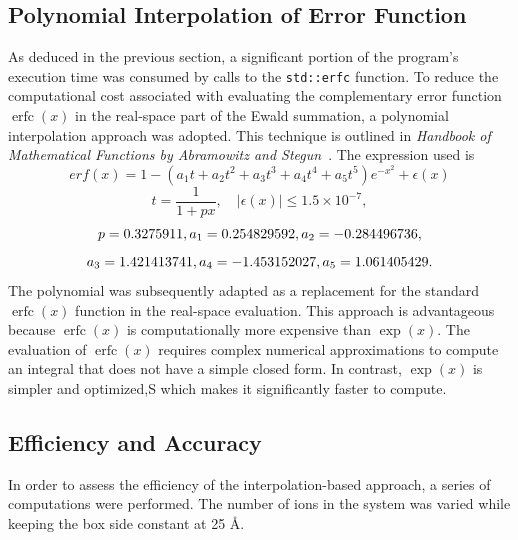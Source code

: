 \subsection{Polynomial Interpolation of Error Function}
As deduced in the previous section, a significant portion of the program’s execution time was consumed by calls to the \verb|std::erfc| function. To reduce the computational cost associated with evaluating the complementary error function \(\operatorname{erfc}(x)\) in the real-space part of the Ewald summation, a polynomial interpolation approach was adopted. This technique is outlined in \textit{Handbook of Mathematical Functions by Abramowitz and Stegun}~\cite{abramowitz1965handbook}. The expression used is
\begin{equation}  
    erf(x) = 1 - (a_1 t + a_2 t^2 + a_3 t^3 + a_4 t^4 + a_5 t^5) e^{-x^2} + \epsilon(x)
\end{equation}
\[
    t = \frac{1}{1 + px}, \quad |\epsilon(x)| \leq 1.5 \times 10^{-7},
\]
\[
p = 0.3275911, \\
a_1 = 0.254829592, \\
a_2 = -0.284496736,
\]
\[
a_3 = 1.421413741, \\
a_4 = -1.453152027, \\
a_5 = 1.061405429.
\]
The polynomial was subsequently adapted as a replacement for the standard $\operatorname{erfc}(x)$ function in the real-space evaluation. This approach is advantageous because $\operatorname{erfc}(x)$ is computationally more expensive than $\operatorname{exp}(x)$. The evaluation of $\operatorname{erfc}(x)$ requires complex numerical approximations to compute an integral that does not have a simple closed form. In contrast, $\operatorname{exp}(x)$ is simpler and optimized,S which makes it significantly faster to compute.

\subsection{Efficiency and Accuracy}
In order to assess the efficiency of the interpolation-based approach, a series of computations were performed. The number of ions in the system was varied while keeping the box side constant at 25 \AA. 

